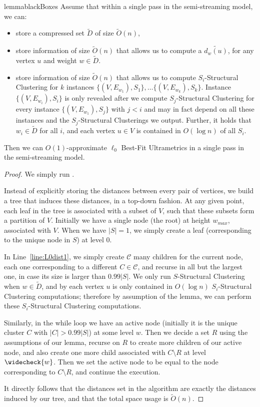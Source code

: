 \documentclass{article}
\newcommand{\lo}{$\ell_0$ Best-Fit Ultrametrics}
\newcommand{\set}[1]{\{#1\}}
\begin{document}
\begin{restatable}{lemma}{blackBoxes}\label{lem:blackBoxes}
Assume that within a single pass in the semi-streaming model, we can:
\begin{itemize}
    \item store a compressed set $\widetilde{D}$ of size $\widetilde{O}(n)$,
    \item store information of size $\widetilde{O}(n)$ that allows us to compute a $\widetilde{d_w(u)}$, for any vertex $u$ and weight $w\in \widetilde{D}$.
    \item store information of size $\widetilde{O}(n)$ that allows us to compute $S_i$-Structural Clustering for $k$ instances $\set{(V, E_{w_1}),S_1}, \ldots \set{(V, E_{w_k}), S_k}$.
    Instance $\set{(V, E_{w_i}),S_i}$ is only revealed after we compute $S_j$-Structural Clustering for every instance $\set{(V, E_{w_1}),S_j}$ with $j<i$ and may in fact depend on all these instances and the $S_j$-Structural Clusterings we output.
    Further, it holds that $w_i\in \widetilde{D}$ for all $i$, and each vertex $u\in V$ is contained in $O(\log{n})$ of all $S_i$.
\end{itemize}
Then we can $O(1)$-approximate \lo{} in a single pass in the semi-streaming model.
\end{restatable}
\begin{proof}
We simply run .

Instead of explicitly storing the distances between every pair of vertices, we build a tree that induces these distances, in a top-down fashion.
At any given point, each leaf in the tree is associated with a subset of $V$, such that these subsets form a partition of $V$.
Initially we have a single node (the root) at height $w_{max}$, associated with $V$.
When we have $|S| = 1$, we simply create a leaf (corresponding to the unique node in $S$) at level $0$.

In Line~\ref{line:L0dist1}, we simply create $\mathcal{C}$ many children for the current node, each one corresponding to a different $C\in \mathcal{C}$, and recurse in all but the largest one, in case its size is larger than $0.99|S|$.
We only run $S$-Structural Clustering when $w\in \widetilde{D}$, and by  each vertex $u$ is only contained in $O(\log{n})$ $S_i$-Structural Clustering computations; therefore by assumption of the lemma, we can perform these $S_i$-Structural Clustering computations.

Similarly, in the while loop we have an active node (initially it is the unique cluster $C$ with $|C| > 0.99|S|$) at some level $w$.
Then we decide a set $R$ using the assumptions of our lemma, recurse on $R$ to create more children of our active node, and also create one more child associated with $C\setminus R$ at level $\widecheck{w}$.
Then we set the active node to be equal to the node corresponding to $C\setminus R$, and continue the execution.

It directly follows that the distances set in the algorithm are exactly the distances induced by our tree, and that the total space usage is $\widetilde{O}(n)$.
\end{proof}
\end{document}
